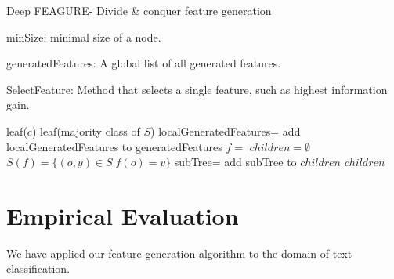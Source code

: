 \documentclass[twoside,11pt]{article}
\theoremstyle{definition}
\begin{document}
\begin{algorithm}[H]
	\caption{Deep FEAGURE- Divide \& conquer feature generation}
	\label{code-tree-thing}
	\small
	minSize: minimal size of a node.
	
	generatedFeatures: A global list of all generated features.
	
	SelectFeature: Method that selects a single feature, such as highest information gain.
	
	\begin{algorithmic}
		\State 
		\Return leaf($c$)
		\EndIf
		\State 
		\Return leaf(majority class of $S$)
		\EndIf
		\State localGeneratedFeatures=
		\State add localGeneratedFeatures to generatedFeatures
		\State $f=$ 
		\State $children=\emptyset$
		\State $S(f)=\{(o,y)\in S|f(o)=v\}$
		\State subTree= 
		\State add subTree to $children$
		\EndFor
		\State \Return $children$
		\EndFunction
		
	\end{algorithmic}
\end{algorithm}




\section{Empirical Evaluation}
We have applied our feature generation algorithm to the domain of text classification. %
\end{document}
